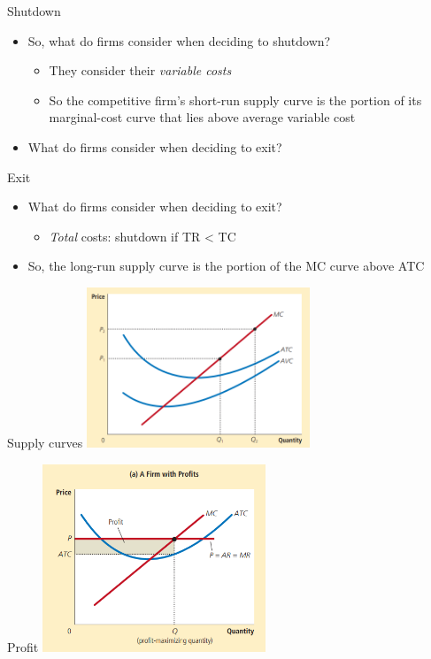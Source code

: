 \documentclass[aspectratio=169]{beamer}
\begin{document}
\begin{frame}{Shutdown}
    \begin{itemize}
        \item So, what do firms consider when deciding to shutdown?
            \begin{itemize}
                \item They consider their \textit{variable costs}
                \item So the competitive firm’s short-run supply curve is the portion of its marginal-cost curve that lies above average variable cost
            \end{itemize}
        \item What do firms consider when deciding to exit?
    \end{itemize}
\end{frame}

\begin{frame}{Exit}
    \begin{itemize}
        \item What do firms consider when deciding to exit?
            \begin{itemize}
                \item \textit{Total} costs: shutdown if TR < TC
            \end{itemize}
        \item So, the long-run supply curve is the portion of the MC curve above ATC
    \end{itemize}
\end{frame}

\begin{frame}{Supply curves}
    \centering
    \includegraphics[width = 0.5\textwidth,keepaspectratio]{../figs/supply.png}
\end{frame}

\begin{frame}{Profit}
    \centering
    \includegraphics[width = 0.5\textwidth,keepaspectratio]{../figs/profit.png}
\end{frame}
\end{document}
